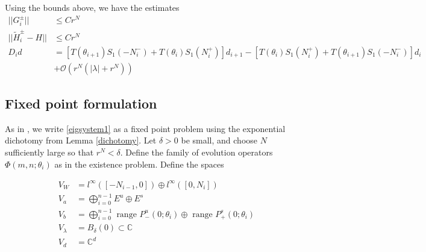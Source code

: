 \documentclass[12pt]{article}
\def\C{{\mathbb C}}
\begin{document}
Using the bounds above, we have the estimates
\begin{align*}
||G_i^\pm|| &\leq C r^N \\
||\tilde{H}_i^\pm - H|| &\leq C r^N \\
D_i d &= [ T(\theta_{i+1}) S_1(-N_i^-) + T(\theta_i) S_1(N_i^+) ] d_{i+1}
- [ T(\theta_i) S_1(N_i^+) + T(\theta_{i+1}) S_1(-N_i^-) ] d_i \\
&+\mathcal{O}(r^N( |\lambda| + r^N))
\end{align*}

\subsection{Fixed point formulation}

As in \cite{Sandstede1998}, we write \eqref{eigsystem1} as a fixed point problem using the exponential dichotomy from Lemma \ref{dichotomy}. Let $\delta > 0$ be small, and choose $N$ sufficiently large so that $r^N < \delta$. Define the family of evolution operators $\Phi(m, n; \theta_i)$ as in the existence problem. Define the spaces

\begin{align*}
V_W &= l^\infty([-N_{i-1}, 0]) \oplus l^\infty([0, N_i])  \\
V_a &= \bigoplus_{i=0}^{n-1} E^u \oplus E^s \\
V_b &= \bigoplus_{i=0}^{n-1} 
\text{ range } P_-^u(0; \theta_i) \oplus \text{ range } P_+^s(0; \theta_i)\\
V_\lambda &= B_\delta(0) \subset \C \\
V_d &= \C^d
\end{align*}
\end{document}
